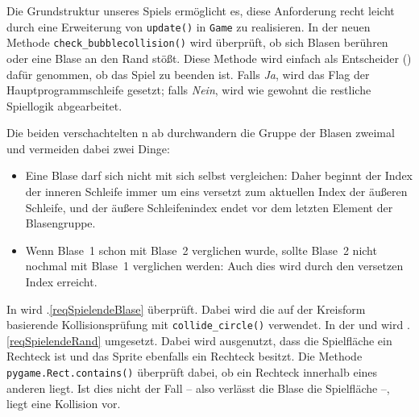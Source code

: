 Die Grundstruktur unseres Spiels ermöglicht es, diese Anforderung recht leicht durch eine Erweiterung von \texttt{update()} in \texttt{Game} zu realisieren. In der neuen Methode \texttt{check\_\-bubble\-coll\-ision()} wird überprüft, ob sich Blasen berühren oder eine Blase an den Rand stößt. Diese Methode wird einfach als Entscheider () dafür genommen, ob das Spiel zu beenden ist. Falls \emph{Ja}, wird das Flag der Hauptprogrammschleife gesetzt; falls \emph{Nein}, wird wie gewohnt die restliche Spiellogik abgearbeitet.


Die beiden verschachtelten \forSchleife n ab  durchwandern die Gruppe der Blasen zweimal und vermeiden dabei zwei Dinge:

\begin{itemize}
	\item Eine Blase darf sich nicht mit sich selbst vergleichen: Daher beginnt der Index der inneren Schleife immer um eins versetzt zum aktuellen Index der äußeren Schleife, und der äußere Schleifenindex endet vor dem letzten Element der Blasengruppe.
	
	\item Wenn Blase~1 schon mit Blase~2 verglichen wurde, sollte Blase~2 nicht nochmal mit Blase~1 verglichen werden: Auch dies wird durch den versetzen Index erreicht.
\end{itemize}



In  wird .\ref{reqSpielendeBlase} überprüft. Dabei wird die auf der Kreisform basierende Kollisionsprüfung mit \texttt{collide\_circle()} verwendet. In der  und  wird .\ref{reqSpielendeRand} umgesetzt. Dabei wird ausgenutzt, dass die Spielfläche ein Rechteck ist und das Sprite ebenfalls ein Rechteck besitzt. Die Methode \texttt{pygame.Rect.contains()} überprüft dabei, ob ein Rechteck innerhalb eines anderen liegt. Ist dies nicht der Fall -- also verlässt die Blase die Spielfläche --, liegt eine Kollision vor.

